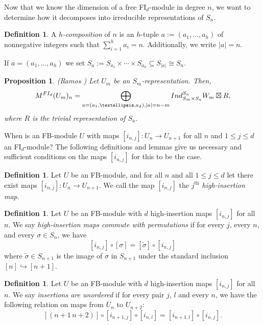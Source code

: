 \documentclass[12py]{amsart}%
\newtheorem{prop}[thm]{Proposition}
\theoremstyle{definition}\newtheorem{definition}[thm]{Definition}
\theoremstyle{definition}
\newtheorem{defn}[thm]{Definition}
\begin{document}
Now that we know the dimension of a free FI$_{d}$-module in degree $n$, we want to determine how it decomposes into irreducible representations of $S_{n}$.

\begin{defn}
A \emph{$h$-composition} of $n$ is an $h$-tuple $a:=(a_{1},\dots, a_{h})$ of nonnegative integers such that $\sum_{i=1}^{h}a_{i}=n$. Additionally, we write $|a|=n$.
\end{defn}

If $a=(a_{1},\dots, a_{h})$ we set $S_{a}:=S_{a_{1}}\times \cdots \times S_{a_{h}}\subseteq S_{|a|}\cong S_{n}$.

\begin{prop}\label{freeFId}
(Ramos \cite[Proposition 3.4]{ramos2017generalized}) Let $U_{m}$ be an $S_{m}$-representation. Then, 
\[
M^{FI_{d}}(U_{m})_{n}=\bigoplus_{a=(a_{1},\dots, a_{d}), |a|=n-m}\emph{Ind}^{S_{n}}_{S_{m}\times S_{a}}W_{m}\boxtimes R,
\]
where $R$ is the trivial representation of $S_{a}$.
\end{prop}

When is an FB-module $U$ with maps $[i_{n,j}]:U_{n}\to U_{n+1}$ for all $n$ and $1\le j\le d$ an FI$_{d}$-module? The following definitions and lemmas give us necessary and sufficient conditions on the maps $[i_{n,j}]$ for this to be the case.

\begin{defn}
Let $U$ be an FB-module, and for all $n$ and all $1\le j\le d$ let there exist maps $[i_{n,j}]:U_{n}\to U_{n+1}$. We call the map $[i_{n,j}]$ the \emph{$j^{\text{th}}$ high-insertion map}.
\end{defn}

\begin{defn}
Let $U$ be an FB-module with $d$ high-insertion maps $[i_{n,j}]$ for all $n$. We say \emph{high-insertion maps commute with permutations} if for every $j$, every $n$, and every $\sigma\in S_{n}$, we have
\[
[i_{n,j}]\circ[\sigma]=[\tilde{\sigma}]\circ[i_{n,j}]
\]
where $\tilde{\sigma}\in S_{n+1}$ is the image of $\sigma$ in $S_{n+1}$ under the standard inclusion $[n]\hookrightarrow [n+1]$.
\end{defn}

\begin{defn}
Let $U$ be an FB-module with $d$ high-insertion maps $[i_{n,j}]$ for all $n$. We say \emph{insertions are unordered} if for every pair $j$, $l$ and every $n$, we have the following relation on maps from $U_{n}$ to $U_{n+2}$:
\[
[(n+1\, n+2)]\circ[i_{n+1,j}]\circ[i_{n,l}]=[i_{n+1,l}]\circ[i_{n,j}].
\]
\end{defn}
\end{document}
